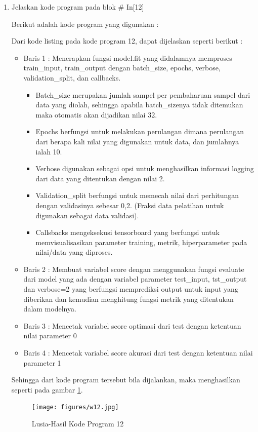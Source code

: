 \begin{enumerate}
\item Jelaskan kode program pada blok \# In[12]
	\par Berikut adalah kode program yang digunakan :
	
	\par Dari kode listing pada kode program 12, dapat dijelaskan seperti berikut :
	\begin{itemize}
	\item Baris 1	: Menerapkan fungsi model.fit yang didalamnya memproses train\_input, train\_output dengan batch\_size, epochs, verbose, validation\_split, dan callbacks.
		\begin{itemize}
		\item Batch\_size merupakan jumlah sampel per pembaharuan sampel dari data yang diolah, sehingga apabila batch\_sizenya tidak ditemukan maka otomatis akan dijadikan nilai 32.
		\item Epochs berfungsi untuk melakukan perulangan dimana perulangan dari berapa kali nilai yang digunakan untuk data, dan jumlahnya ialah 10.
		\item Verbose digunakan sebagai opsi untuk menghasilkan informasi logging dari data yang ditentukan dengan nilai 2.
		\item Validation\_split berfungsi untuk memecah nilai dari perhitungan dengan validasinya sebesar 0,2. (Fraksi data pelatihan untuk digunakan sebagai data validasi).
		\item Callsbacks mengeksekusi tensorboard yang berfungsi untuk memvisualisasikan parameter training, metrik, hiperparameter pada nilai/data yang diproses.
		\end{itemize}	
	\item Baris 2	: Membuat variabel score dengan menggunakan fungsi evaluate dari model yang ada dengan variabel parameter test\_input, tst\_output dan verbose=2 yang berfungsi memprediksi output untuk input yang diberikan dan kemudian menghitung fungsi metrik yang ditentukan dalam modelnya.
	\item Baris 3	: Mencetak variabel score optimasi dari test dengan ketentuan nilai parameter 0
	\item Baris 4	: Mencetak variabel score akurasi dari test dengan ketentuan nilai parameter 1
	\end{itemize}
	\par Sehingga dari kode program tersebut bila dijalankan, maka menghasilkan seperti pada gambar \ref{7B12}.
		\begin{figure}[!hbtp]
		\centering
		\texttt{[image: figures/w12.jpg]}
		\caption{Lusia-Hasil Kode Program 12}
		\label{7B12}
		\end{figure}


\end{enumerate}
